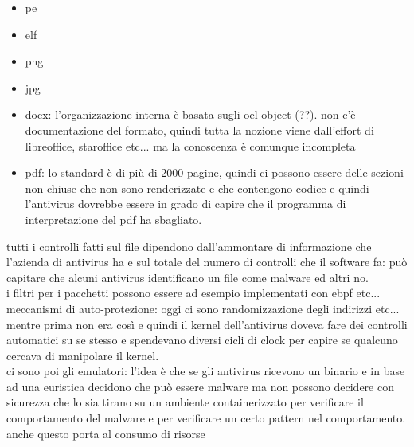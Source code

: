 \documentclass[12pt, oneside]{extbook} %
\begin{document}
\begin{itemize}
\item pe
\item elf
\item png
\item jpg
\item docx: l'organizzazione interna è basata sugli oel object (??). non c'è documentazione del formato, quindi tutta la nozione viene dall'effort di libreoffice, staroffice etc... ma la conoscenza è comunque incompleta
\item pdf: lo standard è di più di 2000 pagine, quindi ci possono essere delle sezioni non chiuse che non sono renderizzate e che contengono codice e quindi l'antivirus dovrebbe essere in grado di capire che il programma di interpretazione del pdf ha sbagliato.
\end{itemize}
tutti i controlli fatti sul file dipendono dall'ammontare di informazione che l'azienda di antivirus ha e sul totale del numero di controlli che il software fa: può capitare che alcuni antivirus identificano un file come malware ed altri no.\\i filtri per i pacchetti possono essere ad esempio implementati con ebpf etc...\\meccanismi di auto-protezione: oggi ci sono randomizzazione degli indirizzi etc... mentre prima non era così e quindi il kernel dell'antivirus doveva fare dei controlli automatici su se stesso e spendevano diversi cicli di clock per capire se qualcuno cercava di manipolare il kernel.\\ci sono poi gli emulatori: l'idea è che se gli antivirus ricevono un binario e in base ad una euristica decidono che può essere malware ma non possono decidere con sicurezza che lo sia tirano su un ambiente containerizzato per verificare il comportamento del malware e per verificare un certo pattern nel comportamento. anche questo porta al consumo di risorse
\end{document}
